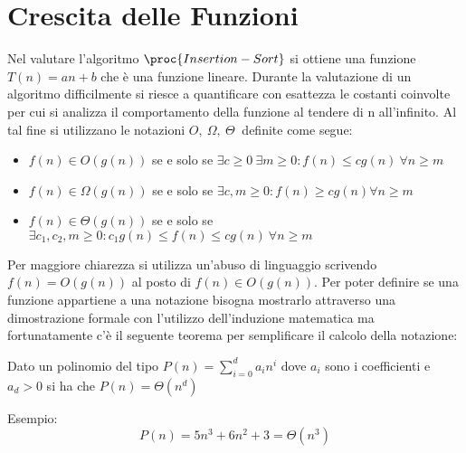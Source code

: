 \chapter{Crescita delle Funzioni}
Nel valutare l'algoritmo $\proc{Insertion-Sort}$ si ottiene una funzione $T(n) = an + b$ che
è una funzione lineare.\newline
Durante la valutazione di un algoritmo difficilmente si riesce a quantificare con
esattezza le costanti coinvolte per cui si analizza il comportamento della funzione
al tendere di n all'infinito.\newline
Al tal fine si utilizzano le notazioni $O,\ \Omega,\ \Theta\ $ definite come segue:

\begin{itemize}
  \item $f(n) \in O(g(n))$ se e solo se $\exists c \geq 0\ \exists m \geq 0 : f(n) \leq cg(n)\ \forall n \geq m$
  \item $f(n) \in \Omega(g(n))$ se e solo se $\exists c, m \geq 0 : f(n) \geq cg(n) \forall n \geq m$
  \item $f(n) \in \Theta(g(n))$ se e solo se $\exists c_1,c_2,m \geq 0 :
        c_1g(n) \leq f(n) \leq cg(n)\ \forall n \geq m$
\end{itemize}
Per maggiore chiarezza si utilizza un'abuso di linguaggio scrivendo $f(n) = O(g(n))$
al posto di $f(n) \in O(g(n))$.\newline
Per poter definire se una funzione appartiene a una notazione bisogna mostrarlo attraverso
una dimostrazione formale con l'utilizzo dell'induzione matematica ma fortunatamente
c'è il seguente teorema per semplificare il calcolo della notazione:
\begin{thm}
Dato un polinomio del tipo $P(n) = \sum _{i = 0} ^ d a_i n^i$ dove $a_i$ sono i coefficienti
e $a_d > 0$ si ha che $P(n) = \Theta(n^d)$
\end{thm}
Esempio:
\begin{equation*}
  P(n) = 5n^3 + 6n^2 + 3 = \Theta(n^3)
\end{equation*}
